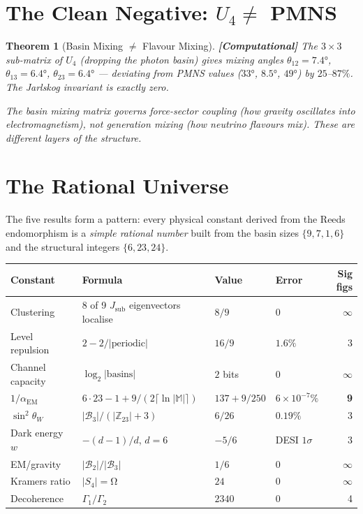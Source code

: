 \documentclass[12pt,a4paper]{article}
\newcommand{\computational}[1]{\textcolor{computational}{\textbf{[Computational]}} #1}
\newtheorem{theorem}{Theorem}[section]
\theoremstyle{definition}\newtheorem{definition}[theorem]{Definition}
\theoremstyle{remark}\newtheorem{remark}[theorem]{Remark}
\renewcommand{\O}{\mathrm{\Omega}}
\newcommand{\Zp}{\mathbb{Z}_{23}}
\newcommand{\Basin}{\mathcal{B}}
\begin{document}
\section{The Clean Negative: $U_4 \neq$ PMNS}
\label{sec:pmns}

\begin{theorem}[Basin Mixing $\neq$ Flavour Mixing]
\label{thm:pmns}
\computational{The $3 \times 3$ sub-matrix of $U_4$ (dropping the photon basin)
gives mixing angles $\theta_{12} = 7.4°$, $\theta_{13} = 6.4°$,
$\theta_{23} = 6.4°$ --- deviating from PMNS values ($33°$, $8.5°$, $49°$) by
$25$--$87\%$. The Jarlskog invariant is exactly zero.}

The basin mixing matrix governs \emph{force-sector} coupling (how gravity
oscillates into electromagnetism), not \emph{generation} mixing (how neutrino
flavours mix). These are different layers of the structure.
\end{theorem}

\section{The Rational Universe}
\label{sec:rational}

The five results form a pattern: every physical constant derived from the Reeds
endomorphism is a \emph{simple rational number} built from the basin sizes
$\{9, 7, 1, 6\}$ and the structural integers $\{6, 23, 24\}$.

\begin{center}
\small
\begin{tabular}{llllr}
\toprule
\textbf{Constant} & \textbf{Formula} & \textbf{Value} & \textbf{Error} & \textbf{Sig figs} \\
\midrule
Clustering & 8 of 9 $J_{\mathrm{sub}}$ eigenvectors localise & $8/9$ & $0$ & $\infty$ \\
Level repulsion & $2 - 2/|\text{periodic}|$ & $16/9$ & $1.6\%$ & 3 \\
Channel capacity & $\log_2|\text{basins}|$ & $2$ bits & $0$ & $\infty$ \\
$1/\alpha_{\mathrm{EM}}$ & $6 \cdot 23 - 1 + 9/(2\lceil\ln|\mathbb{M}|\rceil)$ & $137 + 9/250$ & $6 \times 10^{-7}\%$ & \textbf{9} \\
$\sin^2\theta_W$ & $|\Basin_3|/(|\Zp| + 3)$ & $6/26$ & $0.19\%$ & 3 \\
Dark energy $w$ & $-(d-1)/d$, $d = 6$ & $-5/6$ & DESI $1\sigma$ & 3 \\
EM/gravity & $|\Basin_2|/|\Basin_3|$ & $1/6$ & $0$ & $\infty$ \\
Kramers ratio & $|S_4| = \O$ & $24$ & $0$ & $\infty$ \\
Decoherence & $\Gamma_1/\Gamma_2$ & $2340$ & $0$ & 4 \\
\bottomrule
\end{tabular}
\end{center}
\end{document}
